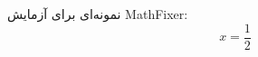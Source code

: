 \documentclass{article}
\begin{document}
نمونه‌ای برای آزمایش MathFixer:
\[
  x = \frac12
\]
\end{document}
